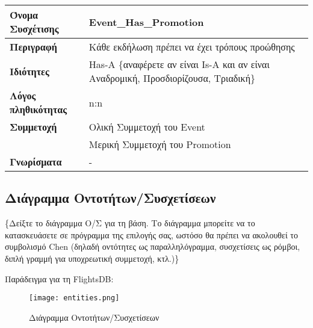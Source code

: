 \begin{tabular}[]{|p{4cm}|p{10cm}|}
  \hline
  \textbf{Όνομα Συσχέτισης} & Event\_Has\_Promotion\\ \hline
  \textbf{Περιγραφή} & Κάθε εκδήλωση πρέπει να έχει τρόπους προώθησης\\ \hline
  \textbf{Ιδιότητες} & Has-A \{αναφέρετε αν είναι Is-A και αν είναι
                       Αναδρομική, Προσδιορίζουσα, Τριαδική\} \\ \hline
  \textbf{Λόγος πληθικότητας} & n:n \\ \hline
  \textbf{Συμμετοχή} & Ολική Συμμετοχή του Event \\ \cline{2-2}
                     & Μερική Συμμετοχή του Promotion \\ \hline
  \textbf{Γνωρίσματα} & - \\ \hline
\end{tabular}

\subsection{Διάγραμμα Οντοτήτων/Συσχετίσεων}

\{Δείξτε το διάγραμμα Ο/Σ για τη βάση. Το διάγραμμα μπορείτε να το
κατασκευάσετε σε πρόγραμμα της επιλογής σας, ωστόσο θα πρέπει να
ακολουθεί το συμβολισμό Chen (δηλαδή οντότητες ως παραλληλόγραμμα,
συσχετίσεις ως ρόμβοι, διπλή γραμμή για υποχρεωτική συμμετοχή, κτλ.)\}

Παράδειγμα για τη FlightsDB:
\begin{figure}[H]
  \centering
  \texttt{[image: entities.png]}
  \caption{Διάγραμμα Οντοτήτων/Συσχετίσεων}
\end{figure}


